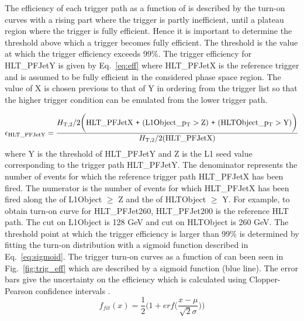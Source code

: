 The efficiency of each trigger path as a function of \httwo is described by the turn-on curves with a rising part where the trigger is partly inefficient, until a plateau region where the trigger is fully efficient. Hence it is important to determine the threshold above which a trigger becomes fully efficient. The threshold is the value at which the trigger efficiency exceeds 99\%. The trigger efficiency for HLT\_PFJetY is given by Eq.~\ref{eq:eff} where HLT\_PFJetX is the reference trigger and is assumed to be fully efficient in the considered phase space region. The value of X is chosen previous to that of Y in \pt ordering from the trigger list so that the higher trigger condition can be emulated from the lower trigger path.

\begin{equation}
 \label{eq:eff}
 {\rm \epsilon_{HLT\_PFJetY}} = \frac{\httwo {\rm \bigg(HLT\_PFJetX~\plus (L1Object\_\pt > Z)~\plus (HLTObject\_\pt > Y)\bigg)}}{\httwo {\rm (HLT\_PFJetX)}}
\end{equation}
where Y is the \pt threshold of HLT\_PFJetY and Z is the L1 seed value corresponding to the trigger path HLT\_PFJetY. The denominator represents the number of events for which the reference trigger path HLT\_PFJetX has been fired. The numerator is the number of events for which HLT\_PFJetX has been fired along the \pt of L1Object $\geq$ Z and the \pt of HLTObject $\geq$ Y. For example, to obtain turn-on curve for HLT\_PFJet260, HLT\_PFJet200 is the reference HLT path. The \pt cut on L1Object is 128 GeV and \pt cut on HLTObject is 260 GeV. The threshold point at which the trigger efficiency is larger than 99\% is determined by fitting the turn-on distribution with a sigmoid function described in Eq.~\ref{eq:sigmoid}. The trigger turn-on curves as a function of \httwo can been seen in Fig.~\ref{fig:trig_eff} which are described by a sigmoid function (blue line). The error bars give the uncertainty on the efficiency which is calculated using Clopper-Pearson confidence intervals \cite{10.2307/2331986}.
\begin{equation}
 \label{eq:sigmoid}
  f_{fit} (x) = \frac {1}{2} \Bigg( 1 ~\texttt{+}~ erf \Big(\frac {x - \mu}{\sqrt{2} \sigma} \Big) \Bigg)
\end{equation}

